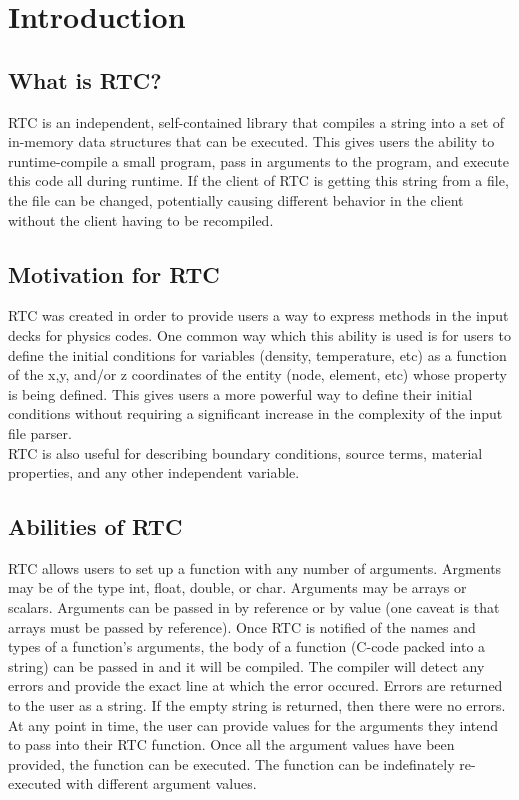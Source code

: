 \documentclass{article}
\begin{document}
\section{Introduction}

\subsection{What is RTC?}

RTC is an independent, self-contained library that compiles a string into
a set of in-memory data structures that can be executed. This gives users the 
ability to runtime-compile a small program, pass in arguments to the program, 
and execute this code all during runtime. If the client of RTC is getting this 
string from a file, the file can be changed, potentially causing different 
behavior in the client without the client having to be recompiled.

\subsection{Motivation for RTC}

RTC was created in order to provide users a way to express methods in the
input decks for physics codes. One common way which this ability is used
is for users to define the initial conditions for variables (density, 
temperature, etc) as a function of the x,y, and/or z coordinates of the 
entity (node, element, etc) whose property is being defined. This gives users
a more powerful way to define their initial conditions without requiring a
significant increase in the complexity of the input file parser. \\

\noindent
RTC is also useful for describing boundary conditions, source terms,
material properties, and any other independent variable. 

\subsection{Abilities of RTC}

RTC allows users to set up a function with any number of arguments. Argments
may be of the type int, float, double, or char. Arguments may be arrays or
scalars. Arguments can be passed in by reference or by value (one caveat is
that arrays must be passed by reference). Once RTC is notified of the names 
and types of a function's arguments, the body of a function (C-code packed into
a string) can be passed in and it will be compiled. The compiler will detect
any errors and provide the exact line at which the error occured. Errors are
returned to the user as a string. If the empty string is returned, then there
were no errors. At any point in time, the user can provide values for the
arguments they intend to pass into their RTC function. Once all the argument
values have been provided, the function can be executed. The function can
be indefinately re-executed with different argument values. 
\end{document}
